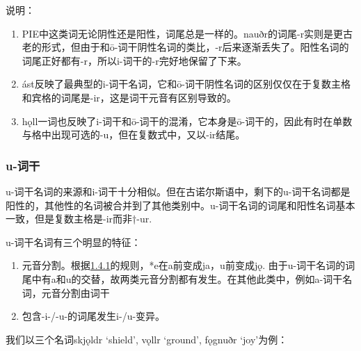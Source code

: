 说明：

\begin{enumerate}
\def\labelenumi{\arabic{enumi})}
\item
  PIE中这类词无论阴性还是阳性，词尾总是一样的。nauðr的词尾-r实则是更古老的形式，但由于和ō-词干阴性名词的类比，-r后来逐渐丢失了。阳性名词的词尾正好都有-r，所以i-词干的-r完好地保留了下来。
\item
  ást反映了最典型的i-词干名词，它和ō-词干阴性名词的区别仅仅在于复数主格和宾格的词尾是-ir，这是词干元音有区别导致的。
\item
  hǫll一词也反映了i-词干和ō-词干的混淆，它本身是ō-词干的，因此有时在单数与格中出现可选的-u，但在复数式中，又以-ir结尾。
\end{enumerate}

\subsubsection{u-词干}\label{u-ux8bcdux5e72}

u-词干名词的来源和i-词干十分相似。但在古诺尔斯语中，剩下的u-词干名词都是阳性的，其他性的名词被合并到了其他类别中。u-词干名词的词尾和阳性名词基本一致，但是复数主格是-ir而非†-ur.

u-词干名词有三个明显的特征：

\begin{enumerate}
\def\labelenumi{\arabic{enumi})}
\item
  元音分割。根据\hyperref[ux5143ux97f3ux7684ux97f3ux53d8]{1.4.1}的规则，*e在a前变成ja，u前变成jǫ.
  由于u-词干名词的词尾中有a和u的交替，故两类元音分割都有发生。在其他此类中，例如a-词干名词，元音分割由词干
\item
  包含-i-/-u-的词尾发生i-/u-变异。
\end{enumerate}

我们以三个名词skjǫldr `shield', vǫllr `ground', fǫgnuðr `joy'为例：

